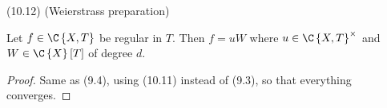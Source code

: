 \begin{cor*}
(10.12) (Weierstrass preparation)

Let $f\in\C\left\{ X,T\right\} $ be regular in $T$. Then $f=uW$
where $u\in\C\left\{ X,T\right\} ^{\times}$ and $W\in\C\left\{ X\right\} \left[T\right]$
of degree $d$.\end{cor*}
\begin{proof}
Same as (9.4), using (10.11) instead of (9.3), so that everything
converges.\end{proof}